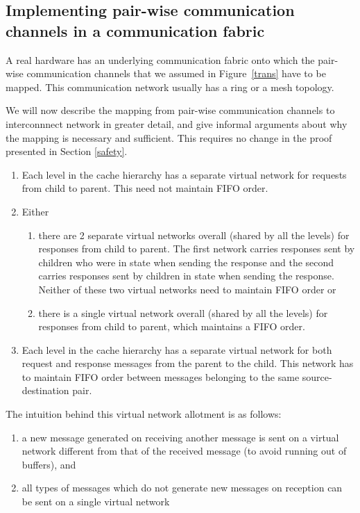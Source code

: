 \subsection{Implementing pair-wise communication channels in a communication
fabric}

A real hardware has an underlying communication fabric onto which the pair-wise
communication channels that we assumed in Figure~\ref{trans} have to be mapped.
This communication network usually has a ring or a mesh topology.

We will now describe the mapping from pair-wise communication channels
to interconnnect network in greater detail, and give informal arguments
about why the mapping is necessary and sufficient. This requires no change in
the proof presented in Section \ref{safety}.

\begin{enumerate}
\item Each level in the cache hierarchy has a separate virtual network
for requests from child to parent. This need not maintain FIFO order.
\item Either
\begin{enumerate}
\item there are 2 separate virtual networks overall (shared by all the levels)
for responses from child to parent. The first network carries responses sent by
children who were in state \Mo{} when sending the response and the second
carries responses sent by children in state \Sh{} when sending the response.
Neither of these two virtual networks need to maintain FIFO order or
\item there is a single virtual network overall (shared by all the levels) for
responses from child to parent, which maintains a FIFO order.
\end{enumerate}
\item Each level in the cache hierarchy has a separate virtual network
for both request and response messages from the parent to the child. This
network has to maintain FIFO order between messages belonging to the same
source-destination pair.
\end{enumerate}

The intuition behind this virtual network allotment is as follows:
\begin{enumerate}
\item a new message generated on receiving another message is sent on a virtual
network different from that of the received message (to avoid running out of
buffers), and
\item all types of messages which do not generate new messages on reception can
be sent on a single virtual network
\end{enumerate}

